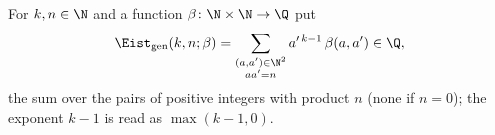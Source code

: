For $k,n\in\N$ and a function $\beta\colon\N\times\N\to\Q$ put
\[
  \Eist_{\mathrm{gen}}(k,n;\beta)=\sum_{\substack{(a,a')\in\N^2\\ aa'=n}}a'^{\,k-1}\,\beta(a,a')\in\Q,
\]
the sum over the pairs of positive integers with product $n$ (none if $n=0$); the exponent $k-1$ is read as $\max(k-1,0)$.
